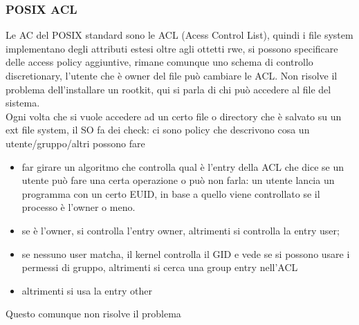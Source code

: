 \documentclass[12pt, oneside]{extbook} %
\begin{document}
\subsubsection{POSIX ACL}
Le AC del POSIX standard sono le ACL (Acess Control List), quindi i file system implementano degli attributi estesi oltre agli ottetti rwe, si possono specificare delle access policy aggiuntive, rimane comunque uno schema di controllo discretionary, l'utente che è owner del file può cambiare le ACL. Non risolve il problema dell'installare un rootkit, qui si parla di chi può accedere al file del sistema.\\ Ogni volta che si vuole accedere ad un certo file o directory che è salvato su un ext file system, il SO fa dei check: ci sono policy che descrivono cosa un utente/gruppo/altri possono fare
\begin{itemize}
\item far girare un algoritmo che controlla qual è l'entry della ACL che dice se un utente può fare una certa operazione o può non farla: un utente lancia un programma con un certo EUID, in base a quello viene controllato se il processo è l'owner o meno.
\item se è l'owner, si controlla l'entry owner, altrimenti si controlla la entry user;
\item se nessuno user matcha, il kernel controlla il GID e vede se si possono usare i permessi di gruppo, altrimenti si cerca una group entry nell'ACL
\item altrimenti si usa la entry other
\end{itemize}
Questo comunque non risolve il problema
\end{document}
